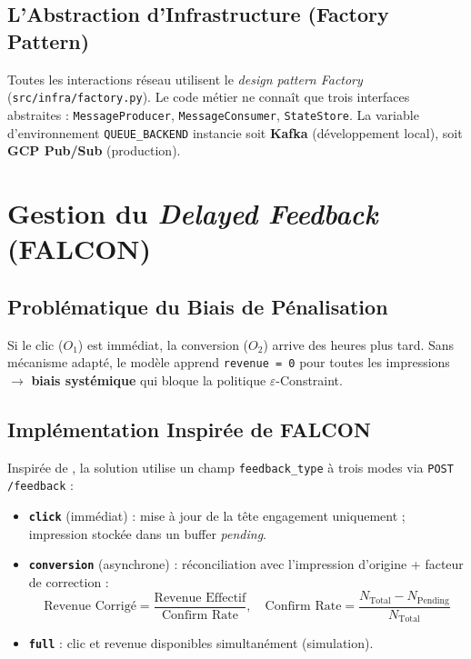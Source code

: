 \subsection{L'Abstraction d'Infrastructure (Factory Pattern)}

Toutes les interactions réseau utilisent le \textit{design pattern Factory} (\texttt{src/infra/factory.py}). Le code métier ne connaît que trois interfaces abstraites : \texttt{MessageProducer}, \texttt{MessageConsumer}, \texttt{StateStore}. La variable d'environnement \texttt{QUEUE\_BACKEND} instancie soit \textbf{Kafka} (développement local), soit \textbf{GCP Pub/Sub} (production).

\section{Gestion du \textit{Delayed Feedback} (FALCON)}
\label{sec:delayed_feedback_ch4}

\subsection{Problématique du Biais de Pénalisation}

Si le clic ($O_1$) est immédiat, la conversion ($O_2$) arrive des heures plus tard. Sans mécanisme adapté, le modèle apprend \texttt{revenue = 0} pour toutes les impressions $\to$ \textbf{biais systémique} qui bloque la politique $\varepsilon$-Constraint.

\subsection{Implémentation Inspirée de FALCON}

Inspirée de \parencite{ktena2019addressing}, la solution utilise un champ \texttt{feedback\_type} à trois modes via \texttt{POST /feedback} :

\begin{itemize}
    \item \textbf{\texttt{click}} (immédiat) : mise à jour de la tête engagement uniquement ; impression stockée dans un buffer \textit{pending}.
    \item \textbf{\texttt{conversion}} (asynchrone) : réconciliation avec l'impression d'origine + facteur de correction :
    $$\text{Revenue Corrigé} = \frac{\text{Revenue Effectif}}{\text{Confirm Rate}}, \quad \text{Confirm Rate} = \frac{N_{\text{Total}} - N_{\text{Pending}}}{N_{\text{Total}}}$$
    \item \textbf{\texttt{full}} : clic et revenue disponibles simultanément (simulation).
\end{itemize}

